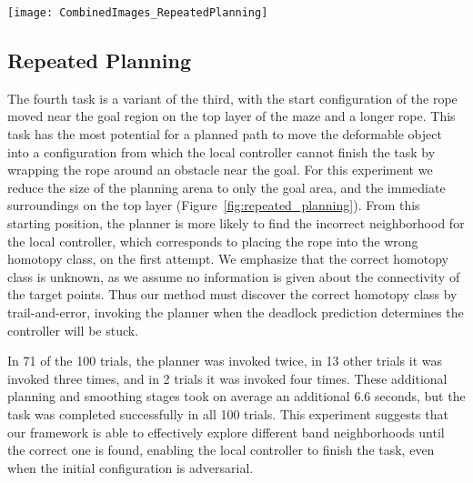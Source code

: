 \begin{figure*}[t]
    \centering
    \texttt{[image: CombinedImages\_RepeatedPlanning]}
    \vspace{-2in}
    \caption{Sequence of snapshots for the fourth experiment. We use the same colors as the previous experiment (Figure~\ref{fig:rope_maze}), but in this example the local controller gets stuck twice, in panels 3 and 6. In panel 7 the global planner finds a new neighbourhood that is distinct from previously-tried neighbourhoods.}
    \label{fig:repeated_planning}
\end{figure*}





\subsection{Repeated Planning}



The fourth task is a variant of the third, with the start configuration of the rope moved near the goal region on the top layer of the maze and a longer rope. This task has the most potential for a planned path to move the deformable object into a configuration from which the local controller cannot finish the task by wrapping the rope around an obstacle near the goal. For this experiment we reduce the size of the planning arena to only the goal area, and the immediate surroundings on the top layer (Figure~\ref{fig:repeated_planning}). From this starting position, the planner is more likely to find the incorrect neighborhood for the local controller, which corresponds to placing the rope into the wrong homotopy class, on the first attempt. We emphasize that the correct homotopy class is unknown, as we assume no information is given about the connectivity of the target points. Thus our method must discover the correct homotopy class by trail-and-error, invoking the planner when the deadlock prediction determines the controller will be stuck.

In 71 of the 100 trials, the planner was invoked twice, in 13 other trials it was invoked three times, and in 2 trials it was invoked four times. These additional planning and smoothing stages took on average an additional 6.6 seconds, but the task was completed successfully in all 100 trials. This experiment suggests that our framework is able to effectively explore different band neighborhoods until the correct one is found, enabling the local controller to finish the task, even when the initial configuration is adversarial.




